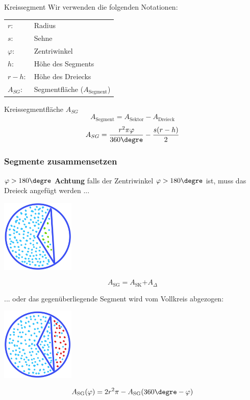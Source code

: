\begin{definition}{Kreissegment}{}
  Wir verwenden die folgenden Notationen:
  \begin{tabular}{ll}
    $r:$        & Radius \\
    $s:$        & Sehne  \\
    $\varphi: $ & Zentriwinkel \\
    $h:$        & Höhe des Segments\\
    $r-h:$      & Höhe des Dreiecks \\
    $A_{SG}:$    & Segmentfläche ($A_{\text{Segment}}$)
    \end{tabular}  
\end{definition}

\begin{gesetz}{Kreissegmentfläche $A_{SG}$}{}
  $$A_{\text{Segment}} = A_{\text{Sektor}} - A_{\text{Dreieck}}$$
  $$A_{SG} = \frac{r^2\pi\varphi}{360\degre} - \frac{s(r-h)}{2}$$
\end{gesetz}
\newpage


\subsubsection{Segmente zusammensetzen}

\begin{bemerkung}{$\varphi>180\degre$}{}
\textbf{Achtung} falls der Zentriwinkel $\varphi > 180\degre$ ist, muss
das Dreieck angefügt werden ...
\begin{center}\includegraphics[width=3.5cm]{tals/plani/img/segment_addieren.png}\end{center}
$$A_{\text{SG}} = A_{\text{SK}} \textbf{+} A_{\Delta}$$


... oder das gegenüberliegende Segment wird vom Vollkreis abgezogen:

\begin{center}\includegraphics[width=3.5cm]{tals/plani/img/segment_subtrahieren.png}\end{center}
$$A_{\text{SG}}(\varphi) = 2r^2\pi - A_{\text{SG}}(360\degre -\varphi)$$

\end{bemerkung}



